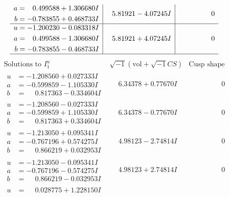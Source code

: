 \documentclass[1p]{elsarticle_modified}
\theoremstyle{definition}
\newcommand{\I}{\sqrt{-1}}
\begin{document}
$$\begin{array}{c|c|c}
\begin{aligned}
a &= \phantom{-}0.499588 + 1.306680 I \\
b &= -0.783855 + 0.468733 I\end{aligned}
 & \phantom{-}5.81921 - 4.07245 I & \phantom{-0.000000 } 0 \\ \hline\begin{aligned}
u &= -1.200230 - 0.083318 I \\
a &= \phantom{-}0.499588 - 1.306680 I \\
b &= -0.783855 - 0.468733 I\end{aligned}
 & \phantom{-}5.81921 + 4.07245 I & \phantom{-0.000000 } 0\\
 \hline 
 \end{array}$$\newpage$$\begin{array}{c|c|c}  
\text{Solutions to }I^u_{1}& \I (\text{vol} + \sqrt{-1}CS) & \text{Cusp shape}\\
 \hline 
\begin{aligned}
u &= -1.208560 + 0.027333 I \\
a &= -0.599859 - 1.105330 I \\
b &= \phantom{-}0.817363 - 0.334604 I\end{aligned}
 & \phantom{-}6.34378 + 0.77670 I & \phantom{-0.000000 } 0 \\ \hline\begin{aligned}
u &= -1.208560 - 0.027333 I \\
a &= -0.599859 + 1.105330 I \\
b &= \phantom{-}0.817363 + 0.334604 I\end{aligned}
 & \phantom{-}6.34378 - 0.77670 I & \phantom{-0.000000 } 0 \\ \hline\begin{aligned}
u &= -1.213050 + 0.095341 I \\
a &= -0.767196 + 0.574275 I \\
b &= \phantom{-}0.866219 + 0.032953 I\end{aligned}
 & \phantom{-}4.98123 - 2.74814 I & \phantom{-0.000000 } 0 \\ \hline\begin{aligned}
u &= -1.213050 - 0.095341 I \\
a &= -0.767196 - 0.574275 I \\
b &= \phantom{-}0.866219 - 0.032953 I\end{aligned}
 & \phantom{-}4.98123 + 2.74814 I & \phantom{-0.000000 } 0 \\ \hline\begin{aligned}
u &= \phantom{-}0.028775 + 1.228150 I \\

\end{aligned}
\end{array}$$
\end{document}
